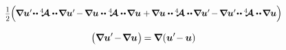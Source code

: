 \begin{equation*}
\smalldisplaystyleonehalf
\hspace{-0.1ex} \scalebox{.95}{$
   \Bigl( \hspace{-0.1ex}
      \boldnabla \bm{u}'
      \hspace{-0.4ex} \dotdotp \hspace{-0.1ex}
      \stiffnesstensor
      \dotdotp \hspace{-0.25ex}
      \boldnabla \bm{u}' \hspace{-0.25ex}
      - \hspace{-0.2ex} \boldnabla \bm{u}
      \dotdotp
      \stiffnesstensor
      \dotdotp \hspace{-0.25ex}
      \boldnabla \bm{u}
      + \hspace{-0.2ex}
      \boldnabla \bm{u}
      \dotdotp \hspace{-0.1ex}
      \stiffnesstensor
      \dotdotp \hspace{-0.25ex}
      \boldnabla \bm{u}' \hspace{-0.25ex}
      - \hspace{-0.2ex}
      \boldnabla \bm{u}' \hspace{-0.4ex}
      \dotdotp \hspace{-0.1ex}
      \stiffnesstensor
      \dotdotp \hspace{-0.25ex}
      \boldnabla \bm{u}
    \Bigr)
$}
\end{equation*}

\begin{equation*}
\bigl(
   \boldnabla \bm{u}' 
   \hspace{-0.3ex} - \hspace{-0.32ex}
   \boldnabla \bm{u}
\hspace{.1ex} \bigr) \hspace{-0.2ex}
= \hspace{-0.1ex}
\boldnabla \hspace{.1ex} (
   \bm{u}' \hspace{-0.4ex} - \hspace{-0.1ex} \bm{u}
)
\end{equation*}

\noindent
{}

